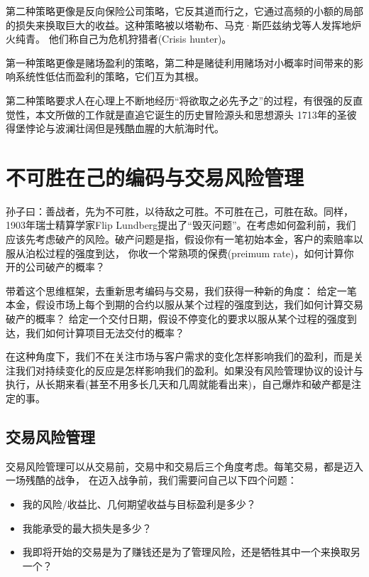 \documentclass[
  oneside]{book}
\providecommand{\tightlist}{%
  \setlength{\itemsep}{0pt}\setlength{\parskip}{0pt}}
\begin{document}
第二种策略更像是反向保险公司策略，它反其道而行之，它通过高频的小额的局部的损失来换取巨大的收益。这种策略被以塔勒布、马克·斯匹兹纳戈等人发挥地炉火纯青。
他们称自己为危机狩猎者(Crisis hunter)。

第一种策略更像是赌场盈利的策略，第二种是赌徒利用赌场对小概率时间带来的影响系统性低估而盈利的策略，它们互为其根。

第二种策略要求人在心理上不断地经历``将欲取之必先予之''的过程，有很强的反直觉性，本文所做的工作就是直追它诞生的历史冒险源头和思想源头
1713年的圣彼得堡悖论与波澜壮阔但是残酷血腥的大航海时代。

\hypertarget{ux4e0dux53efux80dcux5728ux5df1ux7684ux7f16ux7801ux4e0eux4ea4ux6613ux98ceux9669ux7ba1ux7406}{%
\chapter{不可胜在己的编码与交易风险管理}\label{ux4e0dux53efux80dcux5728ux5df1ux7684ux7f16ux7801ux4e0eux4ea4ux6613ux98ceux9669ux7ba1ux7406}}

孙子曰：善战者，先为不可胜，以待敌之可胜。不可胜在己，可胜在敌。同样，1903年瑞士精算学家Flip Lundberg提出了``毁灭问题''。在考虑如何盈利前，我们应该先考虑破产的风险。破产问题是指，假设你有一笔初始本金，客户的索赔率以服从泊松过程的强度到达，
你收一个常熟项的保费(preimum rate)，如何计算你开的公司破产的概率？

带着这个思维框架，去重新思考编码与交易，我们获得一种新的角度：
给定一笔本金，假设市场上每个到期的合约以服从某个过程的强度到达，我们如何计算交易破产的概率？
给定一个交付日期，假设不停变化的要求以服从某个过程的强度到达，我们如何计算项目无法交付的概率？

在这种角度下，我们不在关注市场与客户需求的变化怎样影响我们的盈利，而是关注我们对持续变化的反应是怎样影响我们的盈利。如果没有风险管理协议的设计与执行，从长期来看(甚至不用多长几天和几周就能看出来)，自己爆炸和破产都是注定的事。

\hypertarget{ux4ea4ux6613ux98ceux9669ux7ba1ux7406}{%
\section{交易风险管理}\label{ux4ea4ux6613ux98ceux9669ux7ba1ux7406}}

交易风险管理可以从交易前，交易中和交易后三个角度考虑。每笔交易，都是迈入一场残酷的战争，
在迈入战争前，我们需要问自己以下四个问题：

\begin{itemize}
\tightlist
\item
  我的风险/收益比、几何期望收益与目标盈利是多少？
\item
  我能承受的最大损失是多少？
\item
  我即将开始的交易是为了赚钱还是为了管理风险，还是牺牲其中一个来换取另一个？
\end{itemize}
\end{document}
